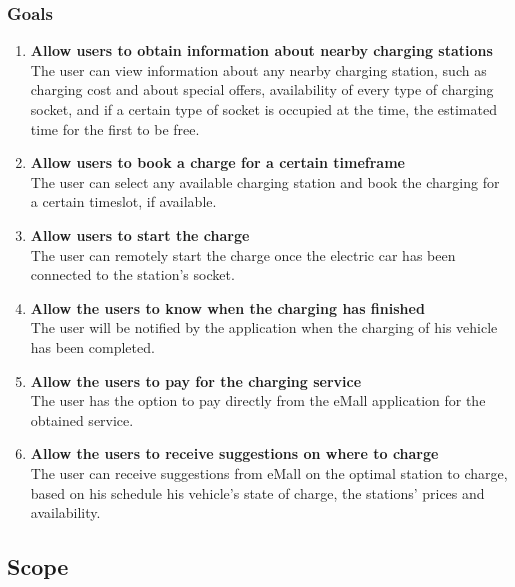 \subsubsection{Goals}
\begin{enumerate}[label=$\bullet$ \textbf{G\arabic*:}]
        \item \textbf{Allow users to obtain information about nearby charging stations}
        \\
        The user can view information about any nearby charging station, 
        such as charging cost and about special offers, availability of every type of charging socket, 
        and if a certain type of socket is occupied at the time,
         the estimated time for the first to be free.
        \item \textbf{Allow users to book a charge for a certain timeframe}
        \\
        The user can select any available charging station and book the charging for a certain timeslot, if available. 
        \item \textbf{Allow users to start the charge}
        \\
        The user can remotely start the charge once the electric car has been connected to the station's socket.
        \item \textbf{Allow the users to know when the charging has finished}
        \\
        The user will be notified by the application when the charging of his vehicle has been completed.
        \item \textbf{Allow the users to pay for the charging service}
        \\
        The user has the option to pay directly from the eMall application for the obtained service.
        \item \textbf{Allow the users to receive suggestions on where to charge}
        \\
        The user can receive suggestions from eMall on the optimal station to charge, based on his schedule his vehicle's state of charge, the stations' prices and availability.
\end{enumerate}

\subsection{Scope}
